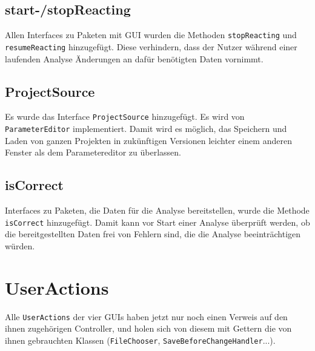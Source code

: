 \documentclass[a4paper]{scrreprt}
\begin{document}
\subsection{start-/stopReacting}
Allen Interfaces zu Paketen mit GUI wurden die Methoden \verb!stopReacting! und \verb!resumeReacting! hinzugefügt. Diese verhindern, dass der Nutzer während einer laufenden Analyse Änderungen an dafür benötigten Daten vornimmt. \\

\subsection{ProjectSource}
Es wurde das Interface \verb!ProjectSource! hinzugefügt. Es wird von \verb!ParameterEditor! implementiert. Damit wird es möglich, das Speichern und Laden von ganzen Projekten in zukünftigen Versionen leichter einem anderen Fenster als dem Parametereditor zu überlassen. \\
\subsection{isCorrect}
Interfaces zu Paketen, die Daten für die Analyse bereitstellen, wurde die Methode \verb!isCorrect! hinzugefügt. Damit kann vor Start einer Analyse überprüft werden, ob die bereitgestellten Daten frei von Fehlern sind, die die Analyse beeinträchtigen würden.

\section{UserActions}
Alle \verb!UserActions! der vier GUIs haben jetzt nur noch einen Verweis auf den ihnen zugehörigen Controller, und holen sich von diesem mit Gettern die von ihnen gebrauchten Klassen (\verb!FileChooser!, \verb!SaveBeforeChangeHandler!...).
\end{document}
